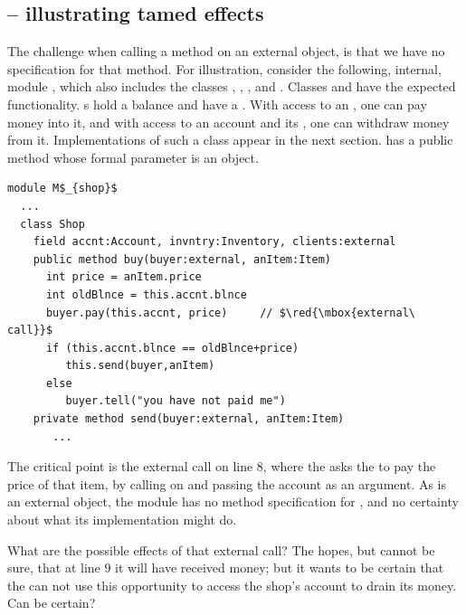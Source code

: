  

\subsection*{ -- illustrating tamed effects} %
\label{sec:how}
\label{sec:shop}

The challenge when calling a method on an external object, is that we have no specification for that method. 
 For illustration, consider the following, internal, module \Mshop, which also includes the classes , , , and . 
Classes  { and  have the expected functionality. 
s hold a balance and have a \password. 
With access to an , %
one  can pay money into it, 
and with access to an account  and its \password, one can withdraw money from it.
Implementations of such a class  appear in the next section.
}
   has  a public method  whose formal parameter  is an    object. 

\begin{lstlisting}[mathescape=true, language=Chainmail, frame=lines]
module M$_{shop}$
  ...   
  class Shop
    field accnt:Account, invntry:Inventory, clients:external      
    public method buy(buyer:external, anItem:Item)
      int price = anItem.price
      int oldBlnce = this.accnt.blnce
      buyer.pay(this.accnt, price)     // $\red{\mbox{external\ call}}$
      if (this.accnt.blnce == oldBlnce+price)  
         this.send(buyer,anItem)
      else
         buyer.tell("you have not paid me")      
    private method send(buyer:external, anItem:Item)  
       ...         
\end{lstlisting}
 

The critical point is the external call on line 8,   {where the  asks the  to pay the price of that item,
by calling   on  and passing the  account as an argument.
As  is an external object, the module \Mshop has no method specification for , and no 
certainty about what its implementation %
might do. 
}

{What are the possible effects of that external call?}
{The  hopes, but cannot be sure, that at line 9  it  will have received money; but 
it wants to be certain  that the  can not use this opportunity to access the 
shop's account to drain its money.
Can   be certain?}

